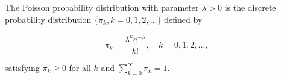 The Poisson probability distribution with parameter $\lambda > 0$ is the discrete probability distribution $\{\pi_k, k = 0, 1, 2, \ldots\}$ defined by

$$\pi_k = \frac{\lambda^k e^{-\lambda}}{k!}, \quad k = 0, 1, 2, \ldots,$$

satisfying $\pi_k \geq 0$ for all $k$ and $\sum_{k=0}^{\infty} \pi_k = 1$.
